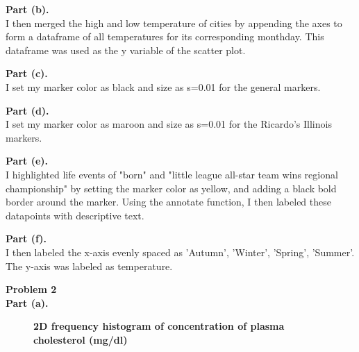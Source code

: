 \documentclass[letterpaper,12pt]{article}
\theoremstyle{definition}
\begin{document}
\textbf{Part (b).} \\
\flushleft I then merged the high and low temperature of cities by appending the axes to form a dataframe of all temperatures for its corresponding monthday. This dataframe was used as the y variable of the scatter plot. 
\flushleft

\textbf{Part (c).} \\
\flushleft I set my marker color as black and size as s=0.01 for the general markers.
\flushleft

\textbf{Part (d).} \\
\flushleft I set my marker color as maroon and size as s=0.01 for the Ricardo's Illinois markers.
\flushleft

\textbf{Part (e).} \\
\flushleft I highlighted life events of "born" and "little league all-star team wins regional championship" by setting the marker color as yellow, and adding a black bold border around the marker. Using the annotate function, I then labeled these datapoints with descriptive text. 
\flushleft

\textbf{Part (f).} \\
\flushleft I then labeled the x-axis evenly spaced as 'Autumn', 'Winter', 'Spring', 'Summer'. The y-axis was labeled as temperature. 
\flushleft

\newpage
\noindent\textbf{Problem 2}\\
\textbf{Part (a).} \\
\begin{figure}[htb]\centering\captionsetup{width=4.0in}
  \caption{\textbf{2D frequency histogram of concentration of plasma cholesterol (mg/dl)}}\label{FigExample}
\end{figure}
\end{document}
